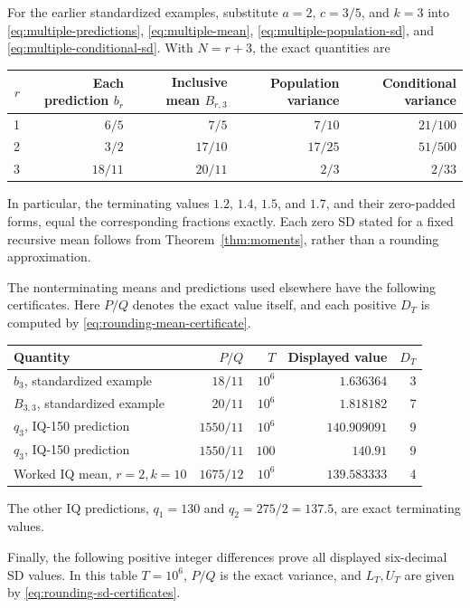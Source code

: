 For the earlier standardized examples, substitute \(a=2\), \(c=3/5\),
and \(k=3\) into
\eqref{eq:multiple-predictions}, \eqref{eq:multiple-mean},
\eqref{eq:multiple-population-sd}, and
\eqref{eq:multiple-conditional-sd}. With \(N=r+3\), the exact quantities
are
\begin{center}
\begin{tabular}{r r r r r}
\hline
\(r\) & Each prediction \(b_r\) & Inclusive mean \(B_{r,3}\) &
Population variance & Conditional variance \\
\hline
1 & \(6/5\) & \(7/5\) & \(7/10\) & \(21/100\) \\
2 & \(3/2\) & \(17/10\) & \(17/25\) & \(51/500\) \\
3 & \(18/11\) & \(20/11\) & \(2/3\) & \(2/33\) \\
\hline
\end{tabular}
\end{center}
In particular, the terminating values \(1.2\), \(1.4\), \(1.5\), and
\(1.7\), and their zero-padded forms, equal the corresponding fractions
exactly. Each zero SD stated for a fixed recursive mean follows from
Theorem~\ref{thm:moments}, rather than a rounding approximation.

The nonterminating means and predictions used elsewhere have the following
certificates. Here \(P/Q\) denotes the exact value itself, and each positive
\(D_T\) is computed by \eqref{eq:rounding-mean-certificate}.

\begin{center}
\begin{tabular}{l r r r r}
\hline
Quantity & \(P/Q\) & \(T\) & Displayed value & \(D_T\) \\
\hline
\(b_3\), standardized example & \(18/11\) & \(10^6\) & \(1.636364\) & 3 \\
\(B_{3,3}\), standardized example & \(20/11\) & \(10^6\) & \(1.818182\) & 7 \\
\(q_3\), IQ-150 prediction & \(1550/11\) & \(10^6\) & \(140.909091\) & 9 \\
\(q_3\), IQ-150 prediction & \(1550/11\) & \(100\) & \(140.91\) & 9 \\
Worked IQ mean, \(r=2,k=10\) & \(1675/12\) & \(10^6\) & \(139.583333\) & 4 \\
\hline
\end{tabular}
\end{center}
The other IQ predictions, \(q_1=130\) and \(q_2=275/2=137.5\), are exact
terminating values.

Finally, the following positive integer differences prove all displayed
six-decimal SD values. In this table \(T=10^6\), \(P/Q\) is the exact
variance, and \(L_T,U_T\) are given by
\eqref{eq:rounding-sd-certificates}.

